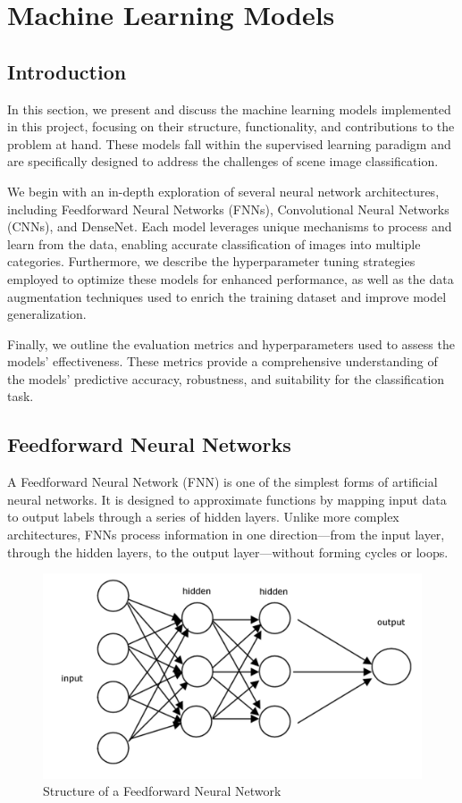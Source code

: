 \section{Machine Learning Models}
\label{sec:ML_Models}
\subsection{Introduction}
In this section, we present and discuss the machine learning models implemented in this project, focusing on their structure, functionality, and contributions to the problem at hand. These models fall within the supervised learning paradigm and are specifically designed to address the challenges of scene image classification.

We begin with an in-depth exploration of several neural network architectures, including Feedforward Neural Networks (FNNs), Convolutional Neural Networks (CNNs), and DenseNet. Each model leverages unique mechanisms to process and learn from the data, enabling accurate classification of images into multiple categories. Furthermore, we describe the hyperparameter tuning strategies employed to optimize these models for enhanced performance, as well as the data augmentation techniques used to enrich the training dataset and improve model generalization.

Finally, we outline the evaluation metrics and hyperparameters used to assess the models’ effectiveness. These metrics provide a comprehensive understanding of the models’ predictive accuracy, robustness, and suitability for the classification task. 


\subsection{Feedforward Neural Networks}
A Feedforward Neural Network (FNN) is one of the simplest forms of artificial neural networks. It is designed to approximate functions by mapping input data to output labels through a series of hidden layers. Unlike more complex architectures, FNNs process information in one direction—from the input layer, through the hidden layers, to the output layer—without forming cycles or loops.


\begin{figure}[h!]
    \centering
    \includegraphics[width=0.8\linewidth]{images/feedforward_structure.png}
    \caption{Structure of a Feedforward Neural Network}
    \label{fig:feedforward_structure}
\end{figure}

